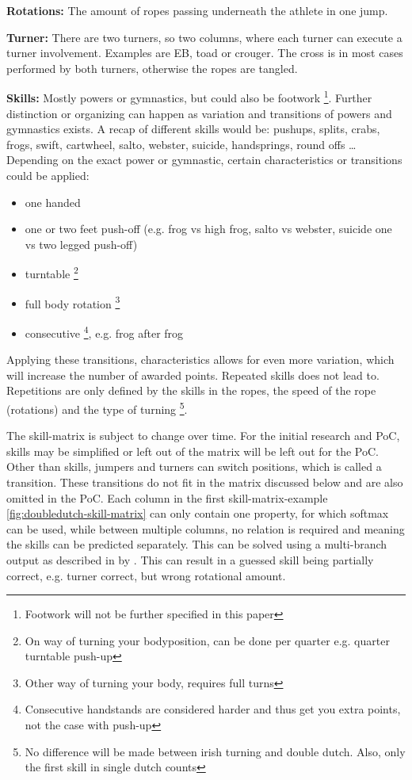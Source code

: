\textbf{Rotations:} The amount of ropes passing underneath the athlete in one jump.

\textbf{Turner:} There are two turners, so two columns, where each turner can execute a turner involvement. Examples are EB, toad or crouger. The cross is in most cases performed by both turners, otherwise the ropes are tangled.

\textbf{Skills:} Mostly powers or gymnastics, but could also be footwork \footnote{Footwork will not be further specified in this paper}. Further distinction or organizing can happen as variation and transitions of powers and gymnastics exists. A recap of different skills would be: pushups, splits, crabs, frogs, swift, cartwheel, salto, webster, suicide, handsprings, round offs \dots %
Depending on the exact power or gymnastic, certain characteristics or transitions could be applied:

\begin{itemize}
    \item one handed
    \item one or two feet push-off (e.g. frog vs high frog, salto vs webster, suicide one vs two legged push-off)
    \item turntable \footnote{On way of turning your bodyposition, can be done per quarter e.g. quarter turntable push-up}
    \item full body rotation \footnote{Other way of turning your body, requires full turns}
    \item consecutive \footnote{Consecutive handstands are considered harder and thus get you extra points, not the case with push-up}, e.g. frog after frog
\end{itemize}

Applying these transitions, characteristics allows for even more variation, which will increase the number of awarded points. Repeated skills does not lead to. Repetitions are only defined by the skills in the ropes, the speed of the rope (rotations) and the type of turning \footnote{No difference will be made between irish turning and double dutch. Also, only the first skill in single dutch counts}.

\medskip

The skill-matrix is subject to change over time. For the initial research and PoC, skills may be simplified or left out of the matrix will be left out for the PoC. Other than skills, jumpers and turners can switch positions, which is called a transition. These transitions do not fit in the matrix discussed below and are also omitted in the PoC.
Each column in the first skill-matrix-example \ref{fig:doubledutch-skill-matrix} can only contain one property, for which softmax can be used, while between multiple columns, no relation is required and meaning the skills can be predicted separately. This can be solved using a multi-branch output as described in by \textcite{Coulibaly_2022}. This can result in a guessed skill being partially correct, e.g. turner correct, but wrong rotational amount.

